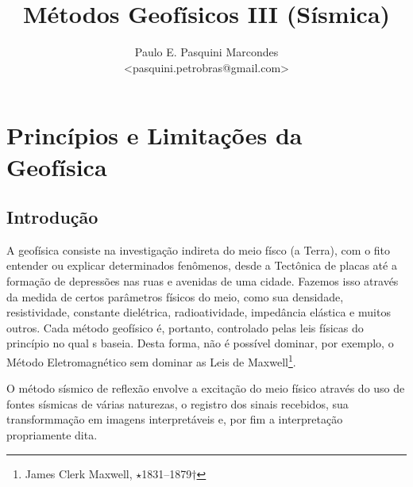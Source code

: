 \documentclass[a4paper,11pt]{scrbook}
\title{M\'etodos Geof\'isicos III (S\'ismica)}
\author{Paulo E. Pasquini Marcondes \\<pasquini.petrobras@gmail.com>}
\begin{document}
\maketitle


\chapter{Princ\'ipios e Limita\c{c}\~oes da Geof\'isica}

	\section{Introdu\c{c}\~ao}
A geof\'isica consiste na investiga\c{c}\~ao indireta do meio f\'isco (a Terra), com o fito entender ou explicar determinados fen\^omenos, desde a Tect\^onica de placas at\'e a forma\c{c}\~ao de depress\~oes nas ruas e avenidas de uma cidade.
Fazemos isso atrav\'es da medida de certos par\^ametros f\'isicos do meio, como sua densidade, resistividade, constante diel\'etrica, radioatividade, imped\^ancia el\'astica e muitos outros.
Cada m\'etodo geof\'isico \'e, portanto, controlado pelas leis f\'isicas do princ\'ipio no qual s baseia. Desta forma, n\~ao \'e poss\'ivel dominar, por exemplo, o M\'etodo Eletromagn\'etico sem dominar as Leis de Maxwell\footnote{James Clerk Maxwell, $\star$1831--1879$\dagger$}.

O m\'etodo s\'ismico de reflexão envolve a excita\c{c}\~ao do meio f\'isico atrav\'es do uso de fontes s\'ismicas de v\'arias naturezas, o registro dos sinais recebidos, sua transformma\c{c}\~ao em imagens interpret\'aveis e, por fim a interpreta\c{c}\~ao propriamente dita.
\end{document}
